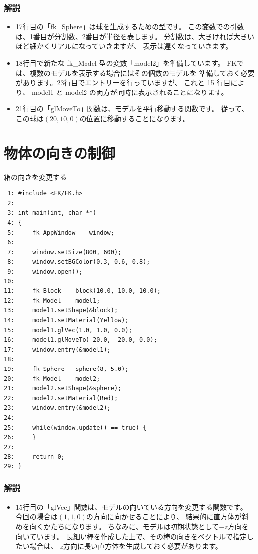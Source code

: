 \subsubsection*{解説}
\begin{itemize}
 \item 17行目の「fk\_Sphere」は球を生成するための型です。
	この変数での引数は、1番目が分割数、2番目が半径を表します。
	分割数は、大きければ大きいほど細かくリアルになっていきますが、
	表示は遅くなっていきます。

 \item 18行目で新たな fk\_Model 型の変数「model2」を準備しています。
	FKでは、複数のモデルを表示する場合にはその個数のモデルを
	準備しておく必要があります。23行目でエントリーを行っていますが、
	これと 15 行目により、
	model1 と model2 の両方が同時に表示されることになります。

 \item 21行目の「glMoveTo」関数は、モデルを平行移動する関数です。
	従って、この球は\((20, 10, 0)\)の位置に移動することになります。

\end{itemize}

\section{物体の向きの制御} \label{sec:01-vec}

\begin{itembox}[l]{箱の向きを変更する}
\begin{verbatim}
 1: #include <FK/FK.h>
 2: 
 3: int main(int, char **)
 4: {
 5:     fk_AppWindow    window;
 6: 
 7:     window.setSize(800, 600);
 8:     window.setBGColor(0.3, 0.6, 0.8);
 9:     window.open();
10: 
11:     fk_Block    block(10.0, 10.0, 10.0);
12:     fk_Model    model1;
13:     model1.setShape(&block);
14:     model1.setMaterial(Yellow);
15:     model1.glVec(1.0, 1.0, 0.0);
16:     model1.glMoveTo(-20.0, -20.0, 0.0);
17:     window.entry(&model1);
18: 
19:     fk_Sphere   sphere(8, 5.0);
20:     fk_Model    model2;
21:     model2.setShape(&sphere);
22:     model2.setMaterial(Red);
23:     window.entry(&model2);
24: 
25:     while(window.update() == true) {
26:     }
27: 
28:     return 0;
29: }
\end{verbatim}
\end{itembox}
\subsubsection*{解説}
\begin{itemize}
 \item 15行目の「glVec」関数は、モデルの向いている方向を変更する関数です。
	今回の場合は\((1, 1, 0)\)の方向に向かせることにより、
	結果的に直方体が斜めを向くかたちになります。
	ちなみに、モデルは初期状態として\(-z\)方向を向いています。
	長細い棒を作成した上で、その棒の向きをベクトルで指定したい場合は、
	\(z\)方向に長い直方体を生成しておく必要があります。
\end{itemize}


